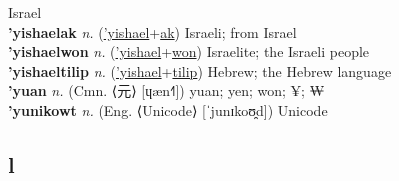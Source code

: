 Israel \label{'yishael} \\
\textbf{'yishaelak} \textit{n.} (\hyperref['yishael]{'yishael}+\hyperref[ak]{ak})
Israeli; from Israel \label{'yishaelak} \\
\textbf{'yishaelwon} \textit{n.} (\hyperref['yishael]{'yishael}+\hyperref[won]{won})
Israelite; the Israeli people \label{'yishaelwon} \\
\textbf{'yishaeltilip} \textit{n.} (\hyperref['yishael]{'yishael}+\hyperref[tilip]{tilip})
Hebrew; the Hebrew language \label{'yishaeltilip} \\
\textbf{'yuan} \textit{n.} (Cmn. ⟨元⟩ [ɥæn˧˥])
yuan; yen; won; ¥; ₩ \label{'yuan} \\
\textbf{'yunikowt} \textit{n.} (Eng. ⟨Unicode⟩ [ˈjunɪkoʊ̯d])
Unicode \label{'yunikowt} \\
\subsection{l}

